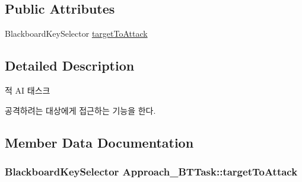 \subsection*{Public Attributes}
\begin{DoxyCompactItemize}
\item 
Blackboard\+Key\+Selector \hyperlink{class_approach___b_t_task_a0af1525e9ae6377da4fecc32e1dfe5f3}{target\+To\+Attack}
\end{DoxyCompactItemize}


\subsection{Detailed Description}
적 AI 태스크 

공격하려는 대상에게 접근하는 기능을 한다. 

\subsection{Member Data Documentation}
\subsubsection[{\texorpdfstring{target\+To\+Attack}{targetToAttack}}]{\setlength{\rightskip}{0pt plus 5cm}Blackboard\+Key\+Selector Approach\+\_\+\+B\+T\+Task\+::target\+To\+Attack}\hypertarget{class_approach___b_t_task_a0af1525e9ae6377da4fecc32e1dfe5f3}{}\label{class_approach___b_t_task_a0af1525e9ae6377da4fecc32e1dfe5f3}
